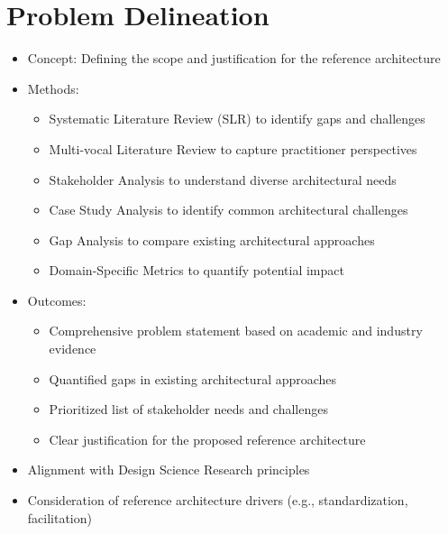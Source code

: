 \documentclass[12pt,a4paper]{article}
\begin{document}
\section{Problem Delineation}
\begin{itemize}
    \item Concept: Defining the scope and justification for the reference architecture
    \item Methods:
    \begin{itemize}
        \item Systematic Literature Review (SLR) to identify gaps and challenges \citep{Kitchenham2004}
        \item Multi-vocal Literature Review to capture practitioner perspectives \citep{Garousi2019}
        \item Stakeholder Analysis to understand diverse architectural needs \citep{Freeman2010}
        \item Case Study Analysis to identify common architectural challenges \citep{Runeson2009}
        \item Gap Analysis to compare existing architectural approaches
        \item Domain-Specific Metrics to quantify potential impact
    \end{itemize}
    \item Outcomes:
    \begin{itemize}
        \item Comprehensive problem statement based on academic and industry evidence
        \item Quantified gaps in existing architectural approaches
        \item Prioritized list of stakeholder needs and challenges
        \item Clear justification for the proposed reference architecture
    \end{itemize}
    \item Alignment with Design Science Research principles \citep{Hevner2004}
    \item Consideration of reference architecture drivers (e.g., standardization, facilitation) \citep{Nakagawa2023}
\end{itemize}
\end{document}
